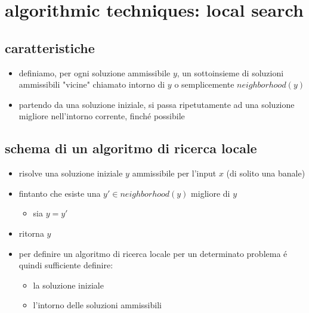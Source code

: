 \section*{algorithmic techniques: local search}


\subsection*{caratteristiche}
\begin{flushleft}
	\begin{itemize}
		\item definiamo, per ogni soluzione ammissibile $y$, un sottoinsieme di soluzioni ammissibili "vicine" chiamato intorno di $y$ o semplicemente $neighborhood(y)$
		\item partendo da una soluzione iniziale, si passa ripetutamente ad una soluzione migliore nell'intorno corrente, finch\'e possibile
	\end{itemize}
\end{flushleft}


\subsection*{schema di un algoritmo di ricerca locale}
\begin{flushleft}
	\begin{itemize}
		\item risolve una soluzione iniziale $y$ ammissibile per l'input $x$ (di solito una banale)
		\item fintanto che esiste una $y'\in neighborhood(y)$ migliore di $y$
		\begin{itemize}
			\item sia $y=y'$
		\end{itemize}
		\item ritorna $y$
		\item per definire un algoritmo di ricerca locale per un determinato problema \'e quindi sufficiente definire:
		\begin{itemize}
			\item la soluzione iniziale
			\item l'intorno delle soluzioni ammissibili
		\end{itemize}
	\end{itemize}
\end{flushleft}

